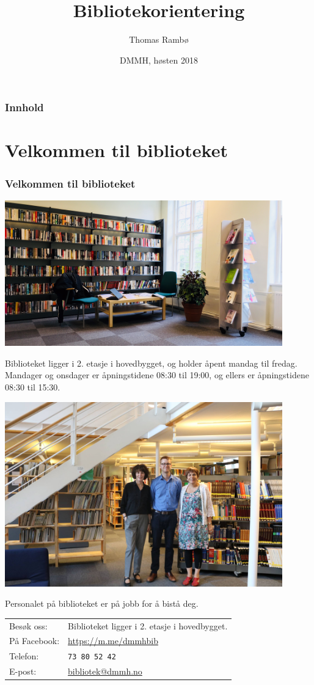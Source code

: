 \documentclass{beamer}
\title{Bibliotekorientering}
\author{Thomas Rambø\inst{1}}
\institute[DMMH-biblioteket]{
  \inst{1}
  Biblioteket\\
  Dronning Mauds Minne Høgskole
}
\date[DMMH 2018]{DMMH, høsten 2018}
\begin{document}
\frame{\titlepage}
\begin{frame}
  \frametitle{Innhold}
  \tableofcontents
\end{frame}

\section{Velkommen til biblioteket}
\begin{frame}
  \frametitle{Velkommen til biblioteket}
  \centering
  \includegraphics[width=0.90\textwidth]{../media/nytt-bibliotek.png}
\end{frame}
\begin{frame}
  Biblioteket ligger i 2. etasje i hovedbygget, og holder åpent mandag til fredag. Mandager og onsdager er åpningstidene \alert{08:30 til 19:00}, og ellers er åpningstidene \alert{08:30 til 15:30}.
\end{frame}
\begin{frame}
  \centering
  \includegraphics[width=0.90\textwidth]{../media/bibliotekansatte.jpg}
\end{frame}
\begin{frame}
  Personalet på biblioteket er på jobb for å bistå deg.

  \vfill
  \begin{tabular}{ l | l }
    Besøk oss: & Biblioteket ligger i 2. etasje i hovedbygget. \\
    På Facebook: & \url{https://m.me/dmmhbib} \\
    Telefon: & \texttt{73 80 52 42} \\
    E-post: & \href{mailto:bibliotek@dmmh.no}{bibliotek@dmmh.no}
  \end{tabular}
\end{frame}
\end{document}
